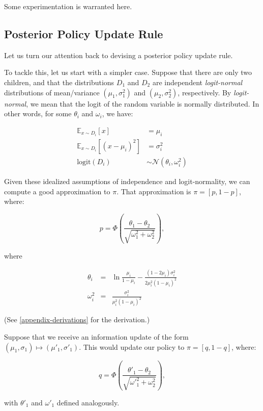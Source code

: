 \documentclass[tikz]{article}
\newcommand{\logit}{\mathrm{logit}}
\begin{document}
Some experimentation is warranted here. 

\subsection{Posterior Policy Update Rule}\label{posterior-section}

Let us turn our attention back to devising a posterior policy update rule. \newline

To tackle this, let us start with a simpler case. Suppose that there are only two children, and that the
distributions $D_1$ and $D_2$ are independent \textit{logit-normal} distributions of mean/variance $(\mu_1, \sigma_1^2)$ and $(\mu_2, \sigma_2^2)$, respectively.
By \textit{logit-normal}, we mean that the logit of the random variable is normally distributed. In other words, for some $\theta_i$ and $\omega_i$, we have:

\begin{align*}
\mathbb{E}_{x \sim D_i}[x] &= \mu_i \\
\mathbb{E}_{x \sim D_i}[(x - \mu_i)^2] &= \sigma_i^2 \\
\logit(D_i) &\sim \mathcal{N}(\theta_i, \omega_i^2)
\end{align*}

Given these idealized assumptions of independence and logit-normality, we can compute a good approximation to $\pi$. That
approximation is $\pi = [p, 1-p]$, where:

$$
p = \Phi\left(\frac{\theta_1 - \theta_2}{\sqrt{\omega_1^2 + \omega_2^2}}\right),
$$

where

\begin{eqnarray*}
\theta_i &=& \ln{\frac{\mu_i}{1-\mu_i}} - \frac{(1 - 2\mu_i)\sigma_i^2}{2\mu_i^2(1-\mu_i)^2} \\
\omega_i^2 &=& \frac{\sigma_i^2}{\mu_i^2(1-\mu_i)^2}
\end{eqnarray*}

(See \ref{appendix-derivations} for the derivation.) \newline

Suppose that we receive an information update of the form $(\mu_1, \sigma_1) \mapsto (\mu'_1, \sigma'_1)$.
This would update our policy to $\pi = [q, 1-q]$, where:

$$
q = \Phi\left(\frac{\theta'_1 - \theta_2}{\sqrt{\omega'_1^2 + \omega_2^2}}\right),
$$

with $\theta'_1$ and $\omega'_1$ defined analogously. \newline
\end{document}

